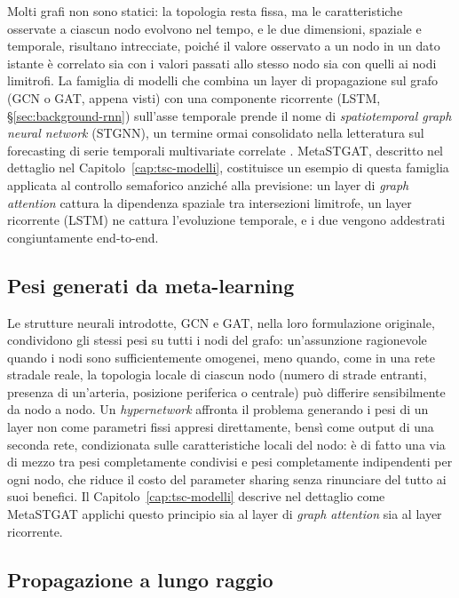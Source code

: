 Molti grafi non sono statici: la topologia resta fissa, ma le
caratteristiche osservate a ciascun nodo evolvono nel tempo, e le due
dimensioni, spaziale e temporale, risultano intrecciate, poiché il valore
osservato a un nodo in un dato istante è correlato sia con i valori
passati allo stesso nodo sia con quelli ai nodi limitrofi. La famiglia di modelli che combina un layer
di propagazione sul grafo (GCN o GAT, appena visti) con una componente
ricorrente (LSTM, §\ref{sec:background-rnn}) sull'asse temporale prende il
nome di \emph{spatiotemporal graph neural network} (STGNN), un termine
ormai consolidato nella letteratura sul forecasting di serie temporali
multivariate correlate \citep{cini2025graphdl}. MetaSTGAT, descritto nel
dettaglio nel Capitolo~\ref{cap:tsc-modelli}, costituisce un esempio di
questa famiglia applicata al controllo semaforico anziché alla previsione:
un layer di \emph{graph attention} cattura la dipendenza spaziale tra
intersezioni limitrofe, un layer ricorrente (LSTM) ne cattura l'evoluzione
temporale, e i due vengono addestrati congiuntamente end-to-end.

\subsection{Pesi generati da meta-learning}

Le strutture neurali introdotte, GCN e GAT, nella loro formulazione originale, condividono gli
stessi pesi su tutti i nodi del grafo: un'assunzione ragionevole
quando i nodi sono sufficientemente omogenei, meno quando, come in una
rete stradale reale, la topologia locale di ciascun nodo (numero di
strade entranti, presenza di un'arteria, posizione periferica o centrale)
può differire sensibilmente da nodo a nodo. Un \emph{hypernetwork}
affronta il problema generando i pesi di un layer non come parametri
fissi appresi direttamente, bensì come output di una seconda rete,
condizionata sulle caratteristiche locali del nodo: è di fatto una via di
mezzo tra pesi completamente condivisi e pesi completamente indipendenti
per ogni nodo, che riduce il costo del parameter sharing senza rinunciare
del tutto ai suoi benefici. Il Capitolo~\ref{cap:tsc-modelli} descrive nel
dettaglio come MetaSTGAT applichi questo principio sia al layer di
\emph{graph attention} sia al layer ricorrente.

\subsection{Propagazione a lungo raggio}

